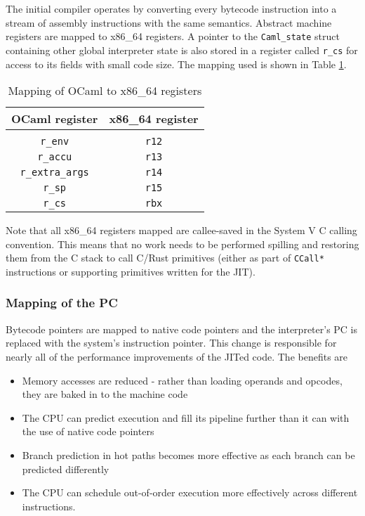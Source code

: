The initial compiler operates by converting every bytecode instruction into a stream of assembly
instructions with the same semantics. Abstract machine registers are mapped to x86\_64 registers. A
pointer to the \texttt{Caml\_state} struct containing other global interpreter state is also
stored in a register called \texttt{r\_cs} for access to its fields with small code size. The
mapping used is shown in Table \ref{table:regmap}.

\begin{table}[h]
      \centering
      \begin{tabular}{cc}\toprule
            OCaml register          & x86\_64 register \\
            \midrule                                   \\
            \texttt{r\_env}         & \texttt{r12}     \\
            \texttt{r\_accu}        & \texttt{r13}     \\
            \texttt{r\_extra\_args} & \texttt{r14}     \\
            \texttt{r\_sp}          & \texttt{r15}     \\
            \texttt{r\_cs}          & \texttt{rbx}     \\
            \bottomrule
      \end{tabular}

      \caption{Mapping of OCaml to x86\_64 registers}
      \label{table:regmap}
\end{table}

Note that all x86\_64 registers mapped are callee-saved in the System V C calling convention. This
means that no work needs to be performed spilling and restoring them from the C stack to call
C/Rust
primitives (either as part of \texttt{CCall*} instructions or supporting primitives written for the
JIT).

\subsubsection{Mapping of the PC}

Bytecode pointers are mapped to native code pointers and the interpreter's PC is replaced with the
system's instruction pointer. This change is responsible for nearly all of the performance
improvements of the JITed code. The benefits are

\begin{itemize}
      \item Memory accesses are reduced - rather than loading operands and opcodes, they are baked
            in to the machine code
      \item The CPU can predict execution and fill its pipeline further than it can with the use of
            native code pointers
      \item Branch prediction in hot paths becomes more effective as each branch can be predicted
            differently
      \item The CPU can schedule out-of-order execution more effectively across different
            instructions.
\end{itemize}


